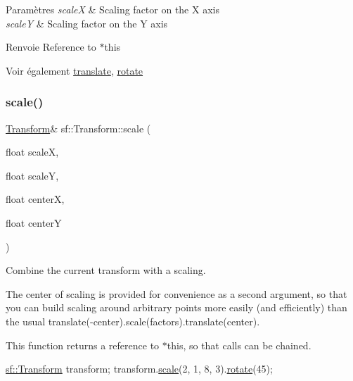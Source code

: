 \begin{DoxyParams}{Paramètres}
{\em scaleX} & Scaling factor on the X axis \\
\hline
{\em scaleY} & Scaling factor on the Y axis\\
\hline
\end{DoxyParams}
\begin{DoxyReturn}{Renvoie}
Reference to $\ast$this
\end{DoxyReturn}
\begin{DoxySeeAlso}{Voir également}
\hyperlink{classsf_1_1Transform_ab54f6c8070cc05e2afcb3145fbf4395a}{translate}, \hyperlink{classsf_1_1Transform_a3e548c3c9e3fb9d4bd43cf852669e555}{rotate} 
\end{DoxySeeAlso}
\mbox{\label{classsf_1_1Transform_a6eaeedd35e289cb17f9bf7f24dc28daa}} 
\subsubsection{\texorpdfstring{scale()}{scale()}\hspace{0.1cm}{\footnotesize\ttfamily [2/4]}}
{\footnotesize\ttfamily \hyperlink{classsf_1_1Transform}{Transform}\& sf\+::\+Transform\+::scale (\begin{DoxyParamCaption}\item[{float}]{scaleX,  }\item[{float}]{scaleY,  }\item[{float}]{centerX,  }\item[{float}]{centerY }\end{DoxyParamCaption})}



Combine the current transform with a scaling. 

The center of scaling is provided for convenience as a second argument, so that you can build scaling around arbitrary points more easily (and efficiently) than the usual translate(-\/center).scale(factors).translate(center).

This function returns a reference to $\ast$this, so that calls can be chained. 
\begin{DoxyCode}
\hyperlink{classsf_1_1Transform}{sf::Transform} transform;
transform.\hyperlink{classsf_1_1Transform_a3f46af807f69d74120fb836334268671}{scale}(2, 1, 8, 3).\hyperlink{classsf_1_1Transform_a3e548c3c9e3fb9d4bd43cf852669e555}{rotate}(45);
\end{DoxyCode}



